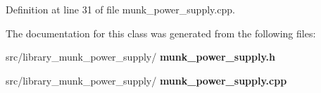 Definition at line 31 of file munk\+\_\+power\+\_\+supply.\+cpp.



The documentation for this class was generated from the following files\+:\begin{DoxyCompactItemize}
\item 
src/library\+\_\+munk\+\_\+power\+\_\+supply/\textbf{ munk\+\_\+power\+\_\+supply.\+h}\item 
src/library\+\_\+munk\+\_\+power\+\_\+supply/\textbf{ munk\+\_\+power\+\_\+supply.\+cpp}\end{DoxyCompactItemize}
